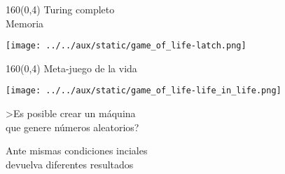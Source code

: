 \documentclass[shownotes,aspectratio=169]{beamer}
\begin{document}
\begin{frame}[plain]
\begin{textblock}{160}(0,4)
 \centering \LARGE
Turing completo \\ \Large Memoria
\end{textblock}
\vspace{1cm}
  
  \centering
\texttt{[image: ../../aux/static/game\_of\_life-latch.png]}


\end{frame}


\begin{frame}[plain]
\begin{textblock}{160}(0,4)
 \centering \LARGE
Meta-juego de la vida
\end{textblock}
\vspace{1cm}

\texttt{[image: ../../aux/static/game\_of\_life-life\_in\_life.png]}
\end{frame}


% 
% 
% 


\begin{frame}[plain]
 
 \LARGE \centering \vspace{0.75cm}
 
 >Es posible crear un máquina  \\ que genere números aleatorios? \\
 
 \vspace{1cm}
 
 \Large Ante mismas condiciones inciales \\ devuelva diferentes resultados
 
\end{frame}
\end{document}
